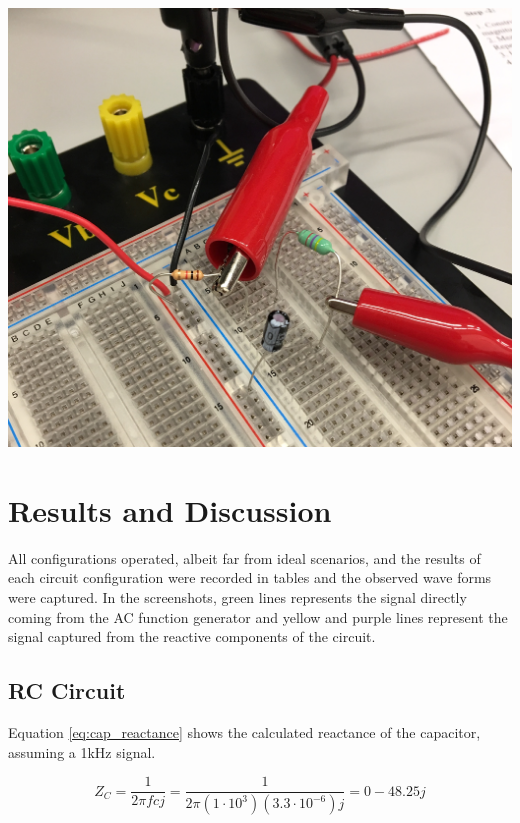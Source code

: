 \documentclass[journal]{IEEEtran}
\begin{document}
\\
\medskip
\medskip

\begingroup
    \centering
    \medskip
    \includegraphics[width=\columnwidth]{images/lab8_circ3.jpg}
    \label{fig:circ3image}
    \medskip
\endgroup

\pagebreak

\section{Results and Discussion}

\noindent All configurations operated, albeit far from ideal scenarios, and the results of each circuit configuration were recorded in tables and the observed wave forms were captured. In the screenshots, green lines represents the signal directly coming from the AC function generator and yellow and purple lines represent the signal captured from the reactive components of the circuit.

\subsection{RC Circuit}
\noindent Equation \ref{eq:cap_reactance} shows the calculated reactance of the capacitor, assuming a 1kHz signal.

\begin{equation}
Z_{C} = \frac{1}{2\pi fcj} = \frac{1}{2\pi(1\cdot10^3)(3.3\cdot10^{-6})j} = 0 - 48.25j
\label{eq:cap_reactance}
\end{equation}
\\
\end{document}
